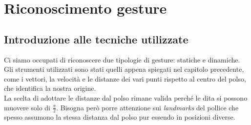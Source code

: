 \chapter{Riconoscimento gesture}

\section{Introduzione alle tecniche utilizzate}

Ci siamo occupati di riconoscere due tipologie di gesture: statiche e dinamiche.\\
Gli strumenti utilizzati sono stati quelli appena spiegati nel capitolo precedente, come i vettori, 
la velocità e le distanze dei vari punti rispetto al centro del polso, che identifica la nostra origine.\\
La scelta di adottare le distanze dal polso rimane valida perché le dita si possono muovere solo di $\frac{\pi}{2}$. Bisogna però porre attenzione sui \textit{landmarks} del pollice che spesso assumono la stessa distanza dal polso pur essendo in posizioni diverse.

